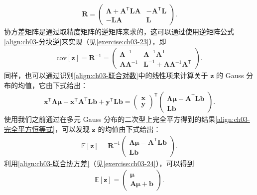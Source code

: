 \documentclass[../../main.tex]{subfiles}
\begin{document}
\begin{align}
\boldsymbol{R}=\begin{pmatrix}\boldsymbol{\Lambda}+\boldsymbol{A}^{\mathsf{T}}\boldsymbol{L}\boldsymbol{A} & -\boldsymbol{A}^{\mathsf{T}}\boldsymbol{L}\\ -\boldsymbol{L}\boldsymbol{A} & \boldsymbol{L}\end{pmatrix}.
\label{align:ch03-联合精度}
\end{align}
协方差矩阵是通过取精度矩阵的逆矩阵来求的，这可以通过使用逆矩阵公式\eqref{align:ch03-分块逆}来实现（见\cref{exercise:ch03-23}），即
\begin{align}
\mathrm{cov}[\boldsymbol{z}]=\boldsymbol{R}^{-1}=\begin{pmatrix}\boldsymbol{\Lambda}^{-1} & \boldsymbol{\Lambda}^{-1}\boldsymbol{A}^{\mathsf{T}}\\ \boldsymbol{A}\boldsymbol{\Lambda}^{-1} & \boldsymbol{L}^{-1}+\boldsymbol{A}\boldsymbol{\Lambda}^{-1}\boldsymbol{A}^{\mathsf{T}}\end{pmatrix}.
\label{align:ch03-联合协方差}
\end{align}
同样，也可以通过识别\eqref{align:ch03-联合对数}中的线性项来计算关于 $\boldsymbol{z}$ 的 Gauss 分布的均值，它由下式给出：
\begin{align}
\boldsymbol{x}^{\mathsf{T}}\boldsymbol{\Lambda}\boldsymbol{\mu}-\boldsymbol{x}^{\mathsf{T}}\boldsymbol{A}^{\mathsf{T}}\boldsymbol{L}\boldsymbol{b}+\boldsymbol{y}^{\mathsf{T}}\boldsymbol{L}\boldsymbol{b}=\begin{pmatrix}\boldsymbol{x}\\ \boldsymbol{y}\end{pmatrix}^{\mathsf{T}}\begin{pmatrix}\boldsymbol{\Lambda}\boldsymbol{\mu}-\boldsymbol{A}^{\mathsf{T}}\boldsymbol{L}\boldsymbol{b}\\ \boldsymbol{L}\boldsymbol{b}\end{pmatrix}.
\label{align:ch03-联合线性项}
\end{align}
使用我们之前通过在多元 Gauss 分布的二次型上完全平方得到的结果\eqref{align:ch03-完全平方恒等式}，可以发现 $\boldsymbol{z}$ 的均值由下式给出：
\begin{align}
\mathbb{E}[\boldsymbol{z}]=\boldsymbol{R}^{-1}\begin{pmatrix}\boldsymbol{\Lambda}\boldsymbol{\mu}-\boldsymbol{A}^{\mathsf{T}}\boldsymbol{L}\boldsymbol{b}\\ \boldsymbol{L}\boldsymbol{b}\end{pmatrix}.
\label{align:ch03-联合均值}
\end{align}
利用\eqref{align:ch03-联合协方差}（见\cref{exercise:ch03-24}），可以得到
\begin{align}
\mathbb{E}[\boldsymbol{z}]=\begin{pmatrix}\boldsymbol{\mu}\\ \boldsymbol{A}\boldsymbol{\mu}+\boldsymbol{b}\end{pmatrix}.
\label{align:ch03-联合均值化简}
\end{align}
\end{document}
